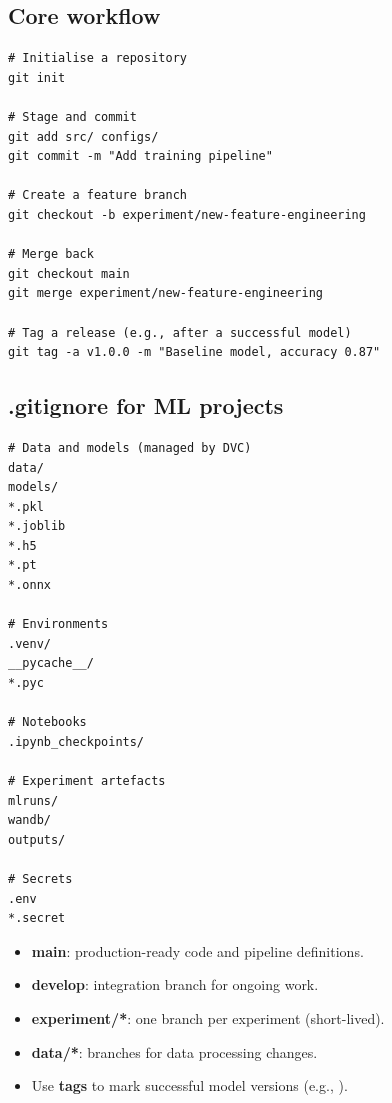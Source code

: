 \subsection{Core workflow}

\begin{codeblock}[title=\textbf{Essential Git commands for ML projects}]
\begin{verbatim}
# Initialise a repository
git init

# Stage and commit
git add src/ configs/
git commit -m "Add training pipeline"

# Create a feature branch
git checkout -b experiment/new-feature-engineering

# Merge back
git checkout main
git merge experiment/new-feature-engineering

# Tag a release (e.g., after a successful model)
git tag -a v1.0.0 -m "Baseline model, accuracy 0.87"
\end{verbatim}
\end{codeblock}

\subsection{.gitignore for ML projects}

\begin{codeblock}[title=\textbf{.gitignore tailored for ML}]
\begin{verbatim}
# Data and models (managed by DVC)
data/
models/
*.pkl
*.joblib
*.h5
*.pt
*.onnx

# Environments
.venv/
__pycache__/
*.pyc

# Notebooks
.ipynb_checkpoints/

# Experiment artefacts
mlruns/
wandb/
outputs/

# Secrets
.env
*.secret
\end{verbatim}
\end{codeblock}

\begin{bestpractice}[title=\textbf{Git branching strategy for ML}]
\begin{itemize}
  \item \textbf{main}: production-ready code and pipeline definitions.
  \item \textbf{develop}: integration branch for ongoing work.
  \item \textbf{experiment/*}: one branch per experiment (short-lived).
  \item \textbf{data/*}: branches for data processing changes.
  \item Use \textbf{tags} to mark successful model versions
    (e.g., ).
\end{itemize}
\end{bestpractice}

